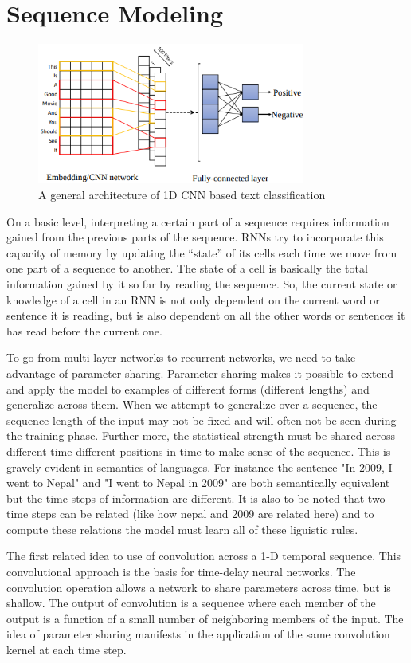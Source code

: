 \documentclass{report}
\begin{document}
\section{Sequence Modeling}

\begin{figure}[ht]
	\includegraphics[width=250pt]{33}
	\centering
	\caption{A general architecture of 1D CNN based text classification}
\end{figure}
On a basic level, interpreting a certain part of a sequence requires information gained from the previous parts of the sequence. RNNs try to incorporate this capacity of memory by updating the “state” of its cells each time we move from one part of a sequence to another. The state of a cell is basically the total information gained by it so far by reading the sequence. So, the current state or knowledge of a cell in an RNN is not only dependent on the current word or sentence it is reading, but is also dependent on all the other words or sentences it has read before the current one.

To go from multi-layer networks to recurrent networks, we need to take advantage of parameter sharing. Parameter sharing makes it possible to extend and apply the model to examples of different forms (different lengths) and generalize across them. When we attempt to generalize over a sequence, the sequence length of the input may not be fixed and will often not be seen during the training phase. Further more, the statistical strength must be shared across different time different positions in time to make sense of the sequence. This is gravely evident in semantics of languages. For instance the sentence "In 2009, I went to Nepal" and "I went to Nepal in 2009" are both semantically equivalent but the time steps of information are different. It is also to be noted that two time steps can be related (like how nepal and 2009 are related here) and to compute these relations the model must learn all of these liguistic rules.

The first related idea to use of convolution across a 1-D temporal sequence. This convolutional approach is the basis for time-delay neural networks. The convolution operation allows a network to share parameters across time, but is shallow. The output of convolution is a sequence where each member of the output is a function of a small number of neighboring members of the input. The idea of parameter sharing manifests in the application of the same convolution kernel at each time step.
\end{document}
